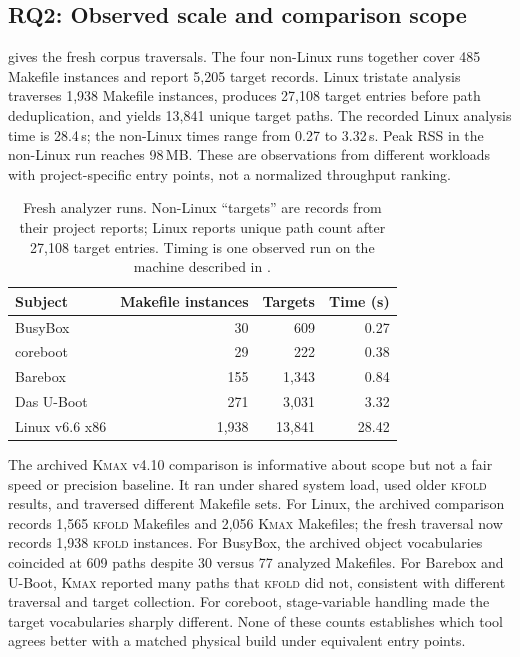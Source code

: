 \documentclass[acmsmall,screen,review]{acmart}
\newcommand{\tool}{\textsc{kfold}\xspace}
\begin{document}
\subsection{RQ2: Observed scale and comparison scope}
\label{sec:eval:scale}
 gives the fresh corpus traversals. The four non-Linux runs together cover 485 Makefile instances and report 5,205 target records. Linux tristate analysis traverses 1,938 Makefile instances, produces 27,108 target entries before path deduplication, and yields 13,841 unique target paths. The recorded Linux analysis time is 28.4\,s; the non-Linux times range from 0.27 to 3.32\,s. Peak RSS in the non-Linux run reaches 98\,MB. These are observations from different workloads with project-specific entry points, not a normalized throughput ranking.

\begin{table}[t]
\centering\footnotesize
\caption{Fresh analyzer runs. Non-Linux ``targets'' are records from their project reports; Linux reports unique path count after 27,108 target entries. Timing is one observed run on the machine described in .}
\label{tab:corpus}
\begin{tabular}{lrrr}
\toprule
Subject & Makefile instances & Targets & Time (s) \\
\midrule
BusyBox & 30 & 609 & 0.27 \\
coreboot & 29 & 222 & 0.38 \\
Barebox & 155 & 1,343 & 0.84 \\
Das U-Boot & 271 & 3,031 & 3.32 \\
Linux v6.6 x86 & 1,938 & 13,841 & 28.42 \\
\bottomrule
\end{tabular}
\end{table}

The archived \textsc{Kmax} v4.10 comparison is informative about scope but not a fair speed or precision baseline. It ran under shared system load, used older \tool results, and traversed different Makefile sets. For Linux, the archived comparison records 1,565 \tool Makefiles and 2,056 \textsc{Kmax} Makefiles; the fresh traversal now records 1,938 \tool instances. For BusyBox, the archived object vocabularies coincided at 609 paths despite 30 versus 77 analyzed Makefiles. For Barebox and U-Boot, \textsc{Kmax} reported many paths that \tool did not, consistent with different traversal and target collection. For coreboot, stage-variable handling made the target vocabularies sharply different. None of these counts establishes which tool agrees better with a matched physical build under equivalent entry points.
\end{document}
